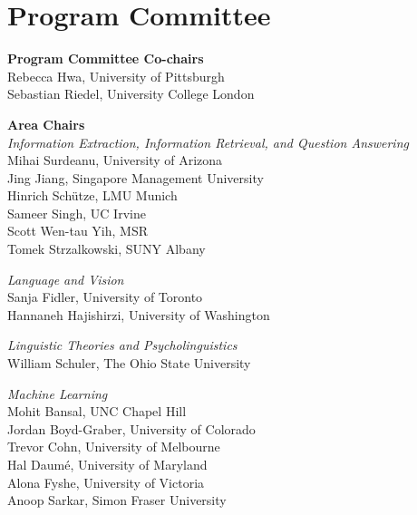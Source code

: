 \clearpage
\section{Program Committee}
\setlength{\parindent}{0pt}

\vspace*{0.5cm}

{\bf Program Committee Co-chairs} \\
Rebecca Hwa, University of Pittsburgh \\
Sebastian Riedel, University College London

{\bf Area Chairs} \\
\emph{Information Extraction, Information Retrieval, and Question Answering} \\
\hspace*{0.2in} Mihai Surdeanu, University of Arizona \\
\hspace*{0.2in} Jing Jiang, Singapore Management University \\
\hspace*{0.2in} Hinrich Schütze, LMU Munich \\
\hspace*{0.2in} Sameer Singh, UC Irvine \\
\hspace*{0.2in} Scott Wen-tau Yih, MSR \\
\hspace*{0.2in} Tomek Strzalkowski, SUNY Albany

\emph{Language and Vision} \\
\hspace*{0.2in} Sanja Fidler, University of Toronto \\
\hspace*{0.2in} Hannaneh Hajishirzi, University of Washington


\emph{Linguistic Theories and Psycholinguistics} \\
\hspace*{0.2in} William Schuler, The Ohio State University

\emph{Machine Learning} \\
\hspace*{0.2in} Mohit Bansal, UNC Chapel Hill \\
\hspace*{0.2in} Jordan Boyd-Graber, University of Colorado \\
\hspace*{0.2in} Trevor Cohn, University of Melbourne\\
\hspace*{0.2in} Hal Daumé, University of Maryland \\
\hspace*{0.2in} Alona Fyshe, University of Victoria \\
\hspace*{0.2in} Anoop Sarkar, Simon Fraser University


